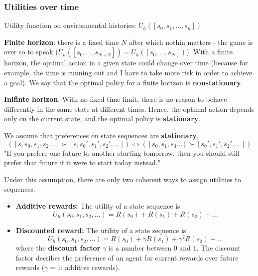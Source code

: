 \documentclass{scrartcl}
\begin{document}
\subsubsection{Utilities over time}
Utility function on environmental histories: \(U_h([s_0, s_1, \dots, s_n])\)

\textbf{Finite horizon}: there is a fixed time \(N\) after which nothin matters - the game is over so to speak (\(U_h([s_0, \dots, s_{N+k}]) = U_h([s_0, \dots, s_N])\)). With a finite horizon, the optimal action in a given state could change over time (because for example, the time is running out and I have to take more risk in order to achieve a goal). We say that the optimal policy for a finite horizon is \textbf{nonstationary}.

\textbf{Inifinte horizon}: With no fixed time limit, there is no reason to behave differently in the same state at different times. Hence, the optimal action depends only on the current state, and the optimal policy is \textbf{stationary}.

\bigbreak

We assume that preferences on state sequences are \textbf{stationary},
\[([s, s_0, s_1, s_2 \dots] \succ [s, s_0', s_1', s_2', \dots]) \Leftrightarrow ([s_0, s_1, s_3 \dots] \succ [s_0', s_1', s_2', \dots]) \]
"If you prefere one future to another starting tomorrow, then you should still prefer that future if it were to start today instead."

Under this assumption, there are only two coherent ways to assign utilities to sequences:
\begin{itemize}
    \item
        \textbf{Additive rewards:} The utility of a state sequence is
        \[U_h(s_0, s_1, s_2, \dots) = R(s_0) + R(s_1) + R(s_2) + \dots\]
    \item
        \textbf{Discounted reward:} The utility of a state sequence is 
        \[U_h(s_0, s_1, s_2, \dots) = R(s_0) + \gamma R(s_1) + \gamma^2 R(s_2) + \dots\]
        where the \textbf{discount factor} \(\gamma\) is a number between \(0\) and \(1\). The discount factor decribes the preference of an agent for current rewards over future rewards (\(\gamma = 1\): additive rewards).
\end{itemize}
\end{document}
